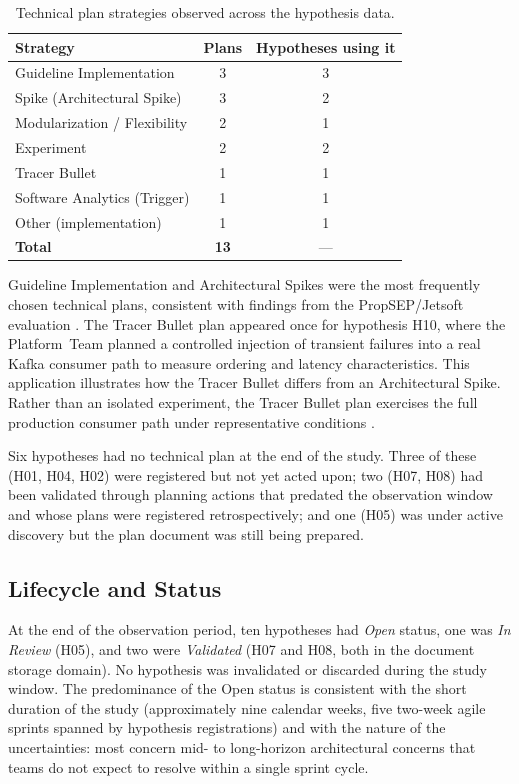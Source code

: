 \begin{table}[htbp]
\caption{Technical plan strategies observed across the hypothesis data.}
\label{tab:plan-strategies}
\centering\small
\begin{tabular}{lcc}
\toprule
\textbf{Strategy} & \textbf{Plans} & \textbf{Hypotheses using it} \\
\midrule
Guideline Implementation & 3 & 3 \\
Spike (Architectural Spike) & 3 & 2 \\
Modularization / Flexibility & 2 & 1 \\
Experiment & 2 & 2 \\
Tracer Bullet & 1 & 1 \\
Software Analytics (Trigger) & 1 & 1 \\
Other (implementation) & 1 & 1 \\
\midrule
\textbf{Total} & \textbf{13} & — \\
\bottomrule
\end{tabular}
\end{table}

Guideline Implementation and Architectural Spikes were the most frequently
chosen technical plans, consistent with findings from the PropSEP/Jetsoft evaluation
\citep{silva2025archhypo}. The Tracer Bullet plan appeared once for hypothesis H10,
where the Platform~Team planned a controlled injection of transient failures into
a real Kafka consumer path to measure ordering and latency characteristics. This
application illustrates how the Tracer Bullet differs from an Architectural Spike. Rather than
an isolated experiment, the Tracer Bullet plan exercises the full production consumer path
under representative conditions \citep{silva2024agilepatterns}.

Six hypotheses had no technical plan at the end of the study. Three of these
(H01, H04, H02) were registered but not yet acted upon; two (H07, H08) had
been validated through planning actions that predated the observation window and
whose plans were registered retrospectively; and one (H05) was under active
discovery but the plan document was still being prepared.

\subsection{Lifecycle and Status}
\label{subsec:lifecycle-status}

At the end of the observation period, ten hypotheses had \textit{Open} status,
one was \textit{In Review} (H05), and two were \textit{Validated} (H07 and H08,
both in the document storage domain). No hypothesis was invalidated or discarded
during the study window. The predominance of the Open status is consistent with
the short duration of the study (approximately nine calendar weeks, five two-week agile sprints spanned by hypothesis registrations) and with the
nature of the uncertainties: most concern mid- to long-horizon architectural
concerns that teams do not expect to resolve within a single sprint cycle.

